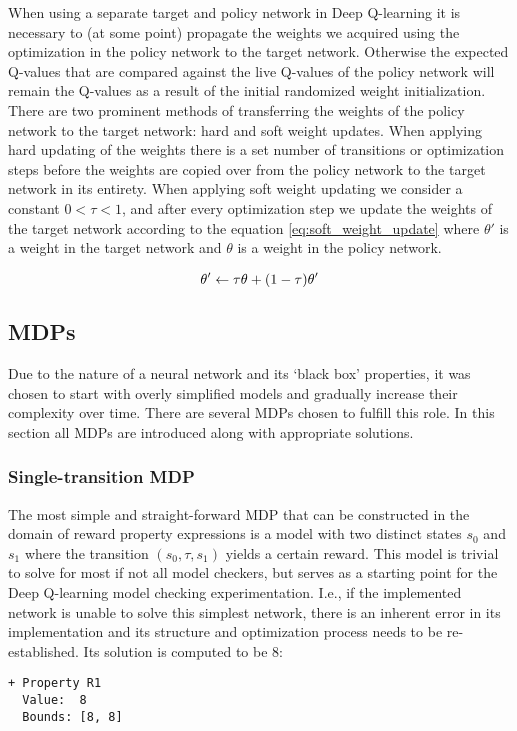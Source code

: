When using a separate target and policy network in Deep Q-learning it is necessary to (at some point) propagate the weights we acquired using the optimization in the policy network to the target network. Otherwise the expected Q-values that are compared against the live Q-values of the policy network will remain the Q-values as a result of the initial randomized weight initialization. There are two prominent methods of transferring the weights of the policy network to the target network: hard and soft weight updates. When applying hard updating of the weights there is a set number of transitions or optimization steps before the weights are copied over from the policy network to the target network in its entirety. When applying soft weight updating we consider a constant $0 < \tau < 1$, and after every optimization step we update the weights of the target network according to the equation \ref{eq:soft_weight_update} where $\theta'$ is a weight in the target network and $\theta$ is a weight in the policy network.

\begin{equation}\label{eq:soft_weight_update}
    \theta\sp{\prime} \gets \tau \theta + (1 - \tau) \theta\sp{\prime}
\end{equation}

\subsection{MDPs}

Due to the nature of a neural network and its `black box' properties, it was chosen to start with overly simplified models and gradually increase their complexity over time. There are several MDPs chosen to fulfill this role. In this section all MDPs are introduced along with appropriate solutions.

\subsubsection{Single-transition MDP}

The most simple and straight-forward MDP that can be constructed in the domain of reward property expressions is a model with two distinct states $s_0$ and $s_1$ where the transition $(s_0, \tau, s_1)$ yields a certain reward. This model is trivial to solve for most if not all model checkers, but serves as a starting point for the Deep Q-learning model checking experimentation. I.e., if the implemented network is unable to solve this simplest network, there is an inherent error in its implementation and its structure and optimization process needs to be re-established. Its solution is computed to be $8$:
\begin{verbatim}
+ Property R1
  Value:  8
  Bounds: [8, 8]
\end{verbatim}

